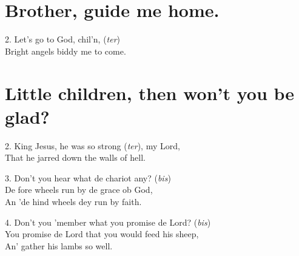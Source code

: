 \documentclass[a5paper,10pt]{book}
\begin{document}
\newpage
\section{Brother, guide me home.}
\thispagestyle{empty}

\begin{song}
\end{song}

\begin{stanza}
\item[2.]
  Let's go to God, chil'n, (\emph{ter})\\
  Bright angels biddy me to come.
\end{stanza}

\begin{extra}
\end{extra}


\newpage
\section{Little children, then won't you be glad?}
\thispagestyle{empty}

\begin{song}
\end{song}

\begin{stanza}
\item[2.]
  King Jesus, he was so strong (\emph{ter}), my Lord,\\
  That he jarred down the walls of hell.
\item[3.]
  Don't you hear what de chariot any? (\emph{bis})\\
  De fore wheels run by de grace ob God,\\
  An 'de hind wheels dey run by faith.
\item[4.]
  Don't you 'member what you promise de Lord? (\emph{bis})\\
  You promise de Lord that you would feed his sheep,\\
  An' gather his lambs so well.
\end{stanza}

\begin{extra}
\end{extra}
\end{document}
